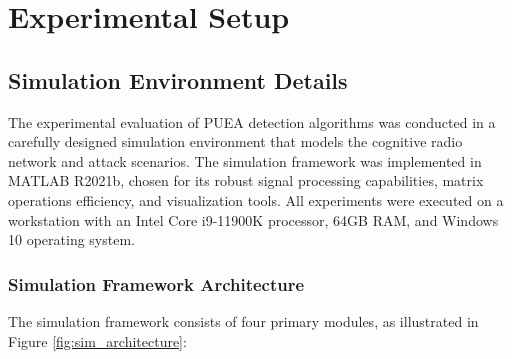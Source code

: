 \chapter{Experimental Setup}

\section{Simulation Environment Details}

The experimental evaluation of PUEA detection algorithms was conducted in a carefully designed simulation environment that models the cognitive radio network and attack scenarios. The simulation framework was implemented in MATLAB R2021b, chosen for its robust signal processing capabilities, matrix operations efficiency, and visualization tools. All experiments were executed on a workstation with an Intel Core i9-11900K processor, 64GB RAM, and Windows 10 operating system.

\subsection{Simulation Framework Architecture}

The simulation framework consists of four primary modules, as illustrated in Figure \ref{fig:sim_architecture}:

